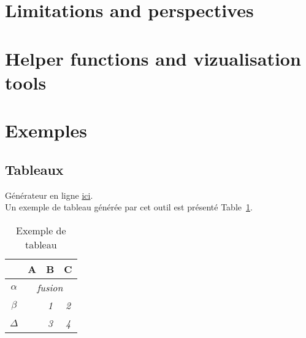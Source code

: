 \section{Limitations and perspectives}
\blindtext


\section{Helper functions and vizualisation tools}
\blindtext



\section{Exemples}

\FloatBarrier
\subsection{Tableaux}

Générateur en ligne \href{http://www.tablesgenerator.com/latex_tables}{ici}. \\

Un exemple de tableau générée par cet outil est présenté Table~\ref{tableau_exemple}.

\begin{table}[]
\centering
\begin{tabular}{c|c|c|c|}
\cline{2-4}
                               & \textbf{A}                 & \textbf{B} & \textbf{C} \\ \hline
\multicolumn{1}{|c|}{$\alpha$} & \multicolumn{3}{c|}{\textit{fusion}}                 \\ \hline
\multicolumn{1}{|c|}{$\beta$}  & \multirow{2}{*}{\textit{}} & \textit{1} & \textit{2} \\ \cline{1-1} \cline{3-4} 
\multicolumn{1}{|c|}{$\Delta$} &                            & \textit{3} & \textit{4} \\ \hline
\end{tabular}
\caption{Exemple de tableau}
\label{tableau_exemple}
\end{table}
